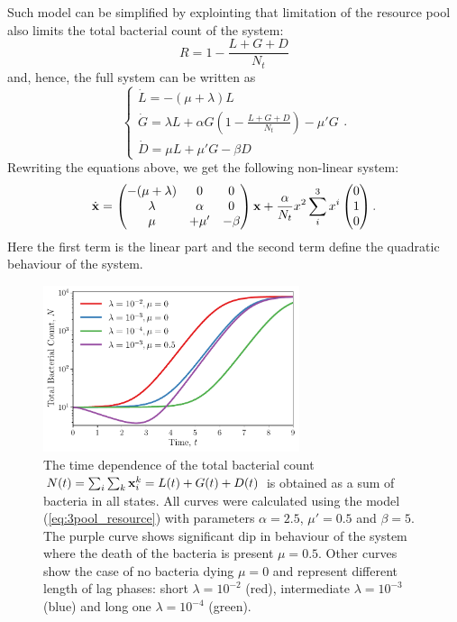 \documentclass[10pt,A4paper]{article}
\begin{document}
Such model can be simplified by explointing that limitation of the resource pool also limits the total bacterial count of the system:
\begin{equation}
    R = 1 - \frac{L+G+D}{N_t}
\end{equation}
and, hence, the full system can be written as 
\begin{equation}
    \begin{cases}
        \dot{L} = -(\mu + \lambda) L\\
        \dot{G} = \lambda L + \alpha G\left(1-\frac{L+G+D}{N_t}\right)-\mu' G\\
        \dot{D} = \mu  L + \mu' G- \beta D 
        \label{eq:3pool_resource} 
    \end{cases}.
\end{equation}
Rewriting the equations above, we get the following non-linear system:
\begin{equation}
    \dot {\mathbf{x}} = \begin{pmatrix}
        -(\mu + \lambda) & 0       & 0 \\
         \lambda         & \alpha  & 0 \\
         \mu & + \mu'& - \beta 
    \end{pmatrix} 
    \mathbf{x} + \frac{\alpha}{N_t} x^2 \sum_i^3 x^i \begin{pmatrix} 0 \\ 1 \\ 0  \end{pmatrix}.
\end{equation}
Here the first term is the linear part and the second term define the quadratic behaviour of the system.

\begin{figure}[t]
    \begin{center}
    \includegraphics[width=0.67\textwidth]{Figures/pool_model_3pools_resource.pdf}
    \caption{{\footnotesize The time dependence of the total bacterial count $N(t) = \sum_i \sum_k \mathbf{x}_i^k = L(t) + G(t) + D(t)$ is obtained as a sum of bacteria in all states.
    All curves were calculated using the model (\ref{eq:3pool_resource}) with parameters $\alpha=2.5$, $\mu'=0.5$ and $\beta=5$.
    The purple curve shows significant dip in behaviour of the system where the death of the bacteria is present $\mu = 0.5$.
    Other curves show the case of no bacteria dying $\mu=0$ and represent different length of lag phases:
    short $\lambda=10^{-2}$ (red), intermediate $\lambda=10^{-3}$ (blue) and long one $\lambda=10^{-4}$ (green).
}}
    \label{fig:3pool_resource_plots}
    \end{center}
\end{figure}
\end{document}
